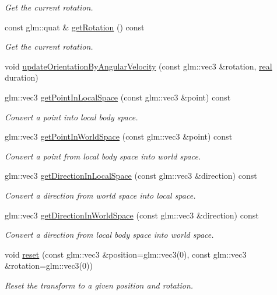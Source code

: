 \begin{DoxyCompactItemize}
\begin{DoxyCompactList}\small\item\em Get the current rotation. \end{DoxyCompactList}\item 
const glm\+::quat \& \mbox{\hyperlink{classr3_1_1_transform3_d_a0a6737bc120cbcd7ae16801291478a35}{get\+Rotation}} () const
\begin{DoxyCompactList}\small\item\em Get the current rotation. \end{DoxyCompactList}\item 
void \mbox{\hyperlink{classr3_1_1_transform3_d_a55dfafe91c164f61bda64882e3a83c90}{update\+Orientation\+By\+Angular\+Velocity}} (const glm\+::vec3 \&rotation, \mbox{\hyperlink{namespacer3_ab2016b3e3f743fb735afce242f0dc1eb}{real}} duration)
\item 
glm\+::vec3 \mbox{\hyperlink{classr3_1_1_transform3_d_a7c6348081c8c1b4d36af89fa7fe2103d}{get\+Point\+In\+Local\+Space}} (const glm\+::vec3 \&point) const
\begin{DoxyCompactList}\small\item\em Convert a point into local body space. \end{DoxyCompactList}\item 
glm\+::vec3 \mbox{\hyperlink{classr3_1_1_transform3_d_a4ecfb0e1518fbeaaa838da02402d0bd9}{get\+Point\+In\+World\+Space}} (const glm\+::vec3 \&point) const
\begin{DoxyCompactList}\small\item\em Convert a point from local body space into world space. \end{DoxyCompactList}\item 
glm\+::vec3 \mbox{\hyperlink{classr3_1_1_transform3_d_ac942055c92499597d01b309b4068917e}{get\+Direction\+In\+Local\+Space}} (const glm\+::vec3 \&direction) const
\begin{DoxyCompactList}\small\item\em Convert a direction from world space into local space. \end{DoxyCompactList}\item 
glm\+::vec3 \mbox{\hyperlink{classr3_1_1_transform3_d_a16c5747e86d579935b808a15f4804b2f}{get\+Direction\+In\+World\+Space}} (const glm\+::vec3 \&direction) const
\begin{DoxyCompactList}\small\item\em Convert a direction from local body space into world space. \end{DoxyCompactList}\item 
void \mbox{\hyperlink{classr3_1_1_transform3_d_ae0eadc0ced65b65d78d721209f8b45de}{reset}} (const glm\+::vec3 \&position=glm\+::vec3(0), const glm\+::vec3 \&rotation=glm\+::vec3(0))
\begin{DoxyCompactList}\small\item\em Reset the transform to a given position and rotation. \end{DoxyCompactList}\end{DoxyCompactItemize}


